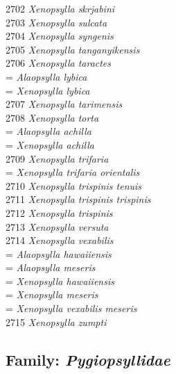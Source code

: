 \documentclass[
]{article}
\begin{document}
2702 \emph{Xenopsylla skrjabini}\\
2703 \emph{Xenopsylla sulcata}\\
2704 \emph{Xenopsylla syngenis}\\
2705 \emph{Xenopsylla tanganyikensis}\\
2706 \emph{Xenopsylla taractes}\\
= \emph{Alaopsylla lybica}\\
= \emph{Xenopsylla lybica}\\
2707 \emph{Xenopsylla tarimensis}\\
2708 \emph{Xenopsylla torta}\\
= \emph{Alaopsylla achilla}\\
= \emph{Xenopsylla achilla}\\
2709 \emph{Xenopsylla trifaria}\\
= \emph{Xenopsylla trifaria orientalis}\\
2710 \emph{Xenopsylla trispinis tenuis}\\
2711 \emph{Xenopsylla trispinis trispinis}\\
2712 \emph{Xenopsylla trispinis}\\
2713 \emph{Xenopsylla versuta}\\
2714 \emph{Xenopsylla vexabilis}\\
= \emph{Alaopsylla hawaiiensis}\\
= \emph{Alaopsylla meseris}\\
= \emph{Xenopsylla hawaiiensis}\\
= \emph{Xenopsylla meseris}\\
= \emph{Xenopsylla vexabilis meseris}\\
2715 \emph{Xenopsylla zumpti}

\hypertarget{family-pygiopsyllidae}{%
\subsection{\texorpdfstring{Family:
\emph{Pygiopsyllidae}}{Family: Pygiopsyllidae}}\label{family-pygiopsyllidae}}
\end{document}
